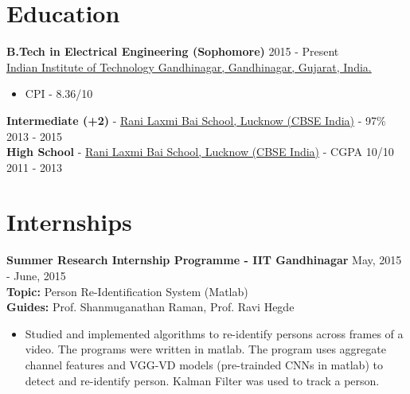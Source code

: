 \documentclass[margin, centered]{res}
\begin{document}
\begin{resume}

\section{Education}
\textbf{B.Tech in Electrical Engineering (Sophomore)} \hfill 2015 - Present
\\
\href{http://www.iitgn.ac.in/}{Indian Institute of Technology Gandhinagar, Gandhinagar, Gujarat, India.}
\begin{itemize}
\item CPI - 8.36/10
\end{itemize}
\textbf{Intermediate (+2)} - \href{http://www.rlbschools.org/}{Rani Laxmi Bai School, Lucknow (CBSE India)} - 97\% \hfill 2013 - 2015
\\
\textbf{High School} - \href{http://www.rlbschools.org/}{Rani Laxmi Bai School, Lucknow (CBSE India)} - CGPA 10/10 \hfill 2011 - 2013


\section{Internships}
\textbf{Summer Research Internship Programme - IIT Gandhinagar} \hfill May, 2015 - June, 2015
\\
{\bf Topic: }Person Re-Identification System (Matlab)
\\
{\bf Guides: }Prof. Shanmuganathan Raman, Prof. Ravi Hegde
\vspace{1mm}
\begin{itemize}
\item Studied and implemented algorithms to re-identify persons across frames of a video. The programs were written in matlab. The program uses aggregate channel features and VGG-VD models (pre-trainded CNNs in matlab) to detect and re-identify person. Kalman Filter was used to track a person.
\end{itemize}


\end{resume}
\end{document}
